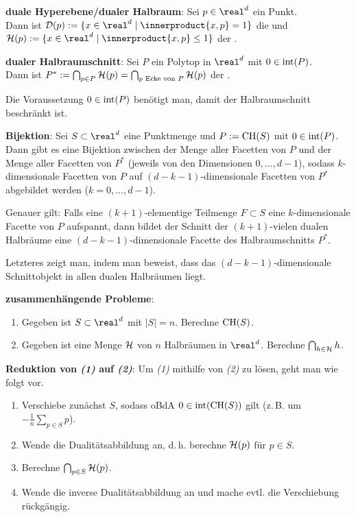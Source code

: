 \linie

\textbf{duale Hyperebene/dualer Halbraum}:
Sei $p \in \real^d$ ein Punkt.\\
Dann ist $\D(p) := \{x \in \real^d \;|\; \innerproduct{x, p} = 1\}$ die  und\\
$\H(p) := \{x \in \real^d \;|\; \innerproduct{x, p} \le 1\}$ der .

\textbf{dualer Halbraumschnitt}:
Sei $P$ ein Polytop in $\real^d$ mit $0 \in \operatorname{int}(P)$.\\
Dann ist $P^\ast := \bigcap_{p \in P} \mathcal{H}(p) = \bigcap_{\text{$p$ Ecke von $P$}} \mathcal{H}(p)$
der .

Die Voraussetzung $0 \in \operatorname{int}(P)$ benötigt man, damit der Halbraumschnitt beschränkt ist.

\linie

\textbf{Bijektion}:
Sei $S \subset \real^d$ eine Punktmenge und $P := \operatorname{CH}(S)$ mit $0 \in \operatorname{int}(P)$.\\
Dann gibt es eine Bijektion zwischen
der Menge aller Facetten von $P$ und
der Menge aller Facetten von $P^\ast$ (jeweils von den Dimensionen $0, \dotsc, d - 1$),
sodass $k$-dimensionale Facetten von $P$ auf $(d - k - 1)$-dimensionale Facetten von $P^\ast$
abgebildet werden ($k = 0, \dotsc, d - 1$).

Genauer gilt:
Falls eine $(k + 1)$-elementige Teilmenge $F \subset S$ eine $k$-dimensionale Facette
von $P$ aufspannt,
dann bildet der Schnitt der $(k + 1)$-vielen dualen Halbräume eine $(d - k - 1)$-dimensionale
Facette des Halbraumschnitts $P^\ast$.

Letzteres zeigt man, indem man beweist, dass das $(d - k - 1)$-dimensionale Schnittobjekt in
allen dualen Halbräumen liegt.

\linie

\textbf{zusammenhängende Probleme}:
\begin{enumerate}
    \item
    Gegeben ist $S \subset \real^d$ mit $|S| = n$.
    Berechne $\operatorname{CH}(S)$.

    \item
    Gegeben ist eine Menge $\mathcal{H}$ von $n$ Halbräumen in $\real^d$.
    Berechne $\bigcap_{h \in \mathcal{H}} h$.
\end{enumerate}

\textbf{Reduktion von \emph{(1)} auf \emph{(2)}}:
Um \emph{(1)} mithilfe von \emph{(2)} zu lösen, geht man wie folgt vor.
\begin{enumerate}
    \item
    Verschiebe zunächst $S$, sodass oBdA $0 \in \operatorname{int}(\operatorname{CH}(S))$ gilt
    (z.\,B. um $-\frac{1}{n} \sum_{p \in S} p$).

    \item
    Wende die Dualitätsabbildung an, d.\,h. berechne $\mathcal{H}(p)$ für $p \in S$.

    \item
    Berechne $\bigcap_{p \in S} \mathcal{H}(p)$.

    \item
    Wende die inverse Dualitätsabbildung an und mache evtl. die Verschiebung rückgängig.
\end{enumerate}

